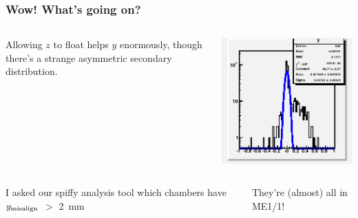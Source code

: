 \documentclass[compress]{beamer}
\begin{document}
\begin{frame}
\frametitle{Wow!  What's going on?}
\vspace{-0.5 cm}
\begin{columns}

Allowing $z$ to float helps $y$ enormously, though there's a strange asymmetric secondary distribution.

\includegraphics[width=\linewidth]{just_endcap_y.png}
\end{columns}

\vfill
\begin{columns}

I asked our spiffy analysis tool which chambers have $y_{\mbox{\scriptsize misalign}}$ $>$ 2~mm

\vspace{0.5 cm}
They're (almost) all in ME1/1!


\end{columns}
\end{frame}
\end{document}
